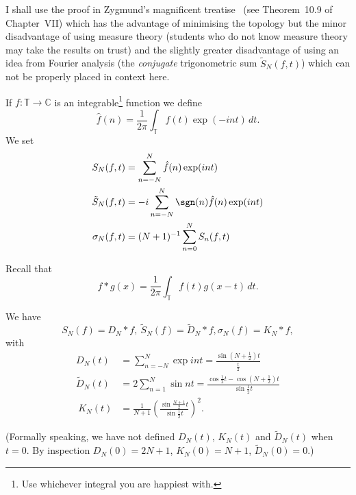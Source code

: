I shall use the proof in Zygmund's magnificent
treatise~\cite{Zygmund}
(see Theorem~10.9 of Chapter~VII)
which has the advantage of minimising the topology
but the minor disadvantage of using measure theory
(students who do not know measure theory may take
the results on trust) and the slightly greater disadvantage
of using an idea from Fourier analysis 
(the \emph{conjugate} trigonometric sum $\tilde{S}_{N}(f,t)$)
which
can not be properly placed in context here.
\begin{definition} If $f:{\mathbb T}\rightarrow{\mathbb C}$
is an integrable\footnote{Use whichever integral you
are happiest with.} function we define
\[\hat{f}(n)=\frac{1}{2\pi}\int_{\mathbb T}f(t)\exp(-int)\,dt.\]
We set
\begin{align*}
S_{N}(f,t)&=\sum_{n=-N}^{N}\hat{f}(n)\exp(int)\\
\tilde{S}_{N}(f,t)&=-i\sum_{n=-N}^{N}\sgn(n)\hat{f}(n)\exp(int)\\
\sigma_{N}(f,t)&=(N+1)^{-1}\sum_{n=0}^{N}S_{n}(f,t)
\end{align*}
\end{definition}
Recall that
\[f*g(x)=\frac{1}{2\pi}\int_{\mathbb T}f(t)g(x-t)\,dt.\]
\begin{lemma} We have
\[S_{N}(f)=D_{N}*f,\ \tilde{S}_{N}(f)=\tilde{D}_{N}*f,
\sigma_{N}(f)=K_{N}*f,\]
with
\begin{align*} 
D_{N}(t)&=\sum_{n=-N}^{N}\exp int=\frac{\sin(N+\tfrac{1}{2})t}
{\tfrac{t}{2}}\\
\tilde{D}_{N}(t)&=2\sum_{n=1}^{N}\sin nt
=\frac{\cos\tfrac{1}{2}t-\cos(N+\tfrac{1}{2})t}{\sin\tfrac{1}{2}t}\\
\ K_{N}(t)&=\frac{1}{N+1}\left(\tfrac{\sin\frac{N+1}{2}t}
{\sin\tfrac{1}{2}t}\right)^{2}.
\end{align*}
\end{lemma}
(Formally speaking, we have not defined $D_{N}(t)$, 
$K_{N}(t)$ and $\tilde{D}_{N}(t)$ when $t=0$.
By inspection 
$D_{N}(0)=2N+1$, $K_{N}(0)=N+1$, $\tilde{D}_{N}(0)=0$.)

